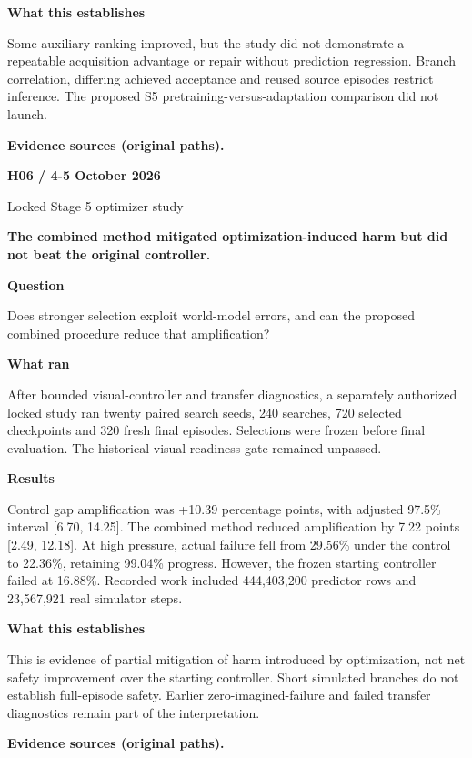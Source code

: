 \documentclass[11pt,a4paper]{article}
\newcommand{\block}[2]{\par\textbf{\color{ink}#1}\par\nopagebreak #2\par}
\newcommand{\finding}[1]{\begin{tcolorbox}[colback=pale,colframe=pale,boxrule=0pt,arc=1mm,left=10pt,right=10pt,top=10pt,bottom=10pt]\color{ink}\large\bfseries #1\end{tcolorbox}}
\begin{document}
\block{What this establishes}{Some auxiliary ranking improved, but the study did not demonstrate a repeatable acquisition advantage or repair without prediction regression. Branch correlation, differing achieved acceptance and reused source episodes restrict inference. The proposed S5 pretraining-versus-adaptation comparison did not launch.}
\vfill{\footnotesize\color{muted}\textbf{Evidence sources (original paths).}\par
\raggedright {}}
\clearpage
{}\label{exp:H06}
{\color{accent}\small\bfseries H06 / 4-5 October 2026}\par
{}\par
{\color{muted}\small Locked Stage 5 optimizer study}\par\vspace{2mm}
\finding{The combined method mitigated optimization-induced harm but did not beat the original controller.}
\block{Question}{Does stronger selection exploit world-model errors, and can the proposed combined procedure reduce that amplification?}
\block{What ran}{After bounded visual-controller and transfer diagnostics, a separately authorized locked study ran twenty paired search seeds, 240 searches, 720 selected checkpoints and 320 fresh final episodes. Selections were frozen before final evaluation. The historical visual-readiness gate remained unpassed.}
\block{Results}{Control gap amplification was +10.39 percentage points, with adjusted 97.5\% interval [6.70, 14.25]. The combined method reduced amplification by 7.22 points [2.49, 12.18]. At high pressure, actual failure fell from 29.56\% under the control to 22.36\%, retaining 99.04\% progress. However, the frozen starting controller failed at 16.88\%. Recorded work included 444,403,200 predictor rows and 23,567,921 real simulator steps.}
\block{What this establishes}{This is evidence of partial mitigation of harm introduced by optimization, not net safety improvement over the starting controller. Short simulated branches do not establish full-episode safety. Earlier zero-imagined-failure and failed transfer diagnostics remain part of the interpretation.}
\vfill{\footnotesize\color{muted}\textbf{Evidence sources (original paths).}\par
\raggedright {}\par {}}
\end{document}
